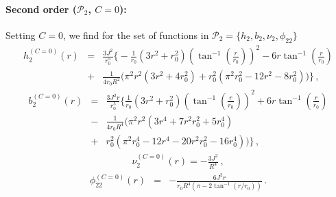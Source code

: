 \documentclass[aps,prd,12pt,superscriptaddress]{revtex4-2}
\begin{document}
\paragraph{Second order ($\mathcal{P}_2$, $C = 0$):} 
Setting $C=0$, we find for the set of functions in $\mathcal{P}_2=\{{h_2}, b_2, \nu_2, \phi_{22}\}$
\begin{eqnarray}
    h_2^{(C=0)}(r) &=& \frac{3J^2}{r_0^5} \big\{
-\frac{1}{r_0} (3r^2+r_0^2) \left(\tan^{-1} \left(\frac{r}{r_0}\right)\right)^2
-6r \tan^{-1} \left(\frac{r}{r_0}\right)
\nonumber 
\\ 
&+& \frac{1}{4r_0R^2} \big(\pi^2r^2(3r^2+4r_0^2)+r_0^2(\pi^2r_0^2-12r^2-8r_0^2)\big)
    \big\}  \, ,
\end{eqnarray}
\begin{eqnarray}
    b_2^{(C=0)}(r) &=&
    \frac{3J^2r}{r_0^5} \big\{
\frac{1}{r_0} (3r^2+r_0^2) \left(\tan^{-1} \left(\frac{r}{r_0}\right)\right)^2
+6r \tan^{-1} \left(\frac{r}{r_0}\right)
\nonumber 
\\ 
&-& \frac{1}{4r_0R^4} \big(\pi^2r^2(3r^4+7r^2r_0^2+5r_0^4)
\nonumber 
\\ 
&+& r_0^2(\pi^2r_0^4-12r^4-20r^2r_0^2-16r_0^4)\big)
    \big\}  \, ,
\end{eqnarray}
\begin{eqnarray}
    \nu_2^{(C=0)}(r) =
    -\frac{3J^2}{R^4}  \, ,
\end{eqnarray}
\begin{eqnarray}
\phi_{22}^{(C=0)} (r) &=&
-\frac{6J^2r}{r_0R^4 (\pi-2\tan^{-1}(r/r_0))} \, .
\end{eqnarray}
\end{document}
